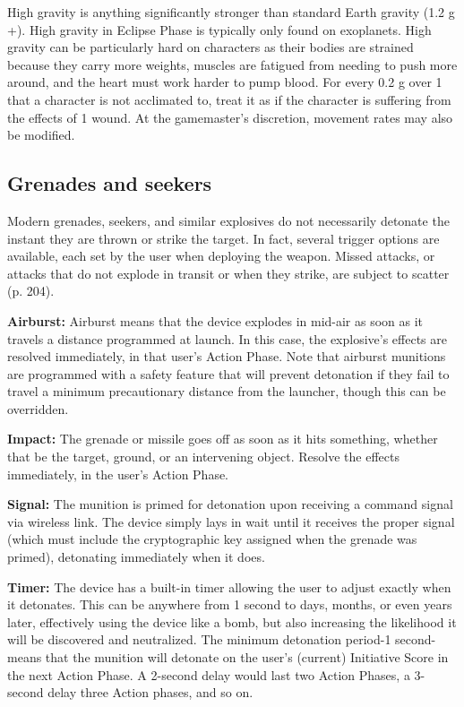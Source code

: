 High gravity is anything significantly stronger than standard Earth gravity (1.2 g +). High gravity in Eclipse Phase is typically only found on exoplanets. High gravity can be particularly hard on characters as their bodies are strained because they carry more weights, muscles are fatigued from needing to push more around, and the heart must work harder to pump blood. For every 0.2 g over 1 that a character is not acclimated to, treat it as if the character is suffering from the effects of 1 wound. At the gamemaster’s discretion, movement rates may also be modified.

\subsection{Grenades and seekers}
\label{sec:combat-grenades-seekers}

Modern grenades, seekers, and similar explosives do not necessarily detonate the instant they are thrown or strike the target. In fact, several trigger options are available, each set by the user when deploying the weapon. Missed attacks, or attacks that do not explode in transit or when they strike, are subject to scatter (p. 204).

\textbf{Airburst:} Airburst means that the device explodes in mid-air as soon as it travels a distance programmed at launch. In this case, the explosive’s effects are resolved immediately, in that user’s Action Phase. Note that airburst munitions are programmed with a safety feature that will prevent detonation if they fail to travel a minimum precautionary distance from the launcher, though this can be overridden.

\textbf{Impact:} The grenade or missile goes off as soon as it hits something, whether that be the target, ground, or an intervening object. Resolve the effects immediately, in the user’s Action Phase.

\textbf{Signal:} The munition is primed for detonation upon receiving a command signal via wireless link. The device simply lays in wait until it receives the proper signal (which must include the cryptographic key assigned when the grenade was primed), detonating immediately when it does.

\textbf{Timer:} The device has a built-in timer allowing the user to adjust exactly when it detonates. This can be anywhere from 1 second to days, months, or even years later, effectively using the device like a bomb, but also increasing the likelihood it will be discovered and neutralized. The minimum detonation period-1 second-means that the munition will detonate on the user’s (current) Initiative Score in the next Action Phase. A 2-second delay would last two Action Phases, a 3-second delay three Action phases, and so on.

